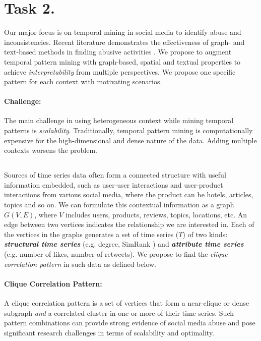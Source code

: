


\section{Task 2. \Ttwo}

Our major focus is on temporal mining in social media to identify abuse and inconsistencies. Recent literature demonstrates the effectiveness of graph- and text-based methods in finding abusive activities \cite{Akoglu:13,Jindal:08,Jindal:10}. We propose to augment temporal pattern mining with graph-based, spatial and textual properties to achieve {\it interpretability} from multiple perspectives. We propose one specific pattern for each context with motivating scenarios. %

\paragraph{Challenge:} The main challenge in using heterogeneous context while mining temporal patterns is {\it scalability}. Traditionally, temporal pattern mining is computationally expensive for the high-dimensional and dense nature of the data. Adding multiple contexts worsens the problem.


\subsection{\Ttwotwo}  

Sources of time series data often form a connected structure with useful information embedded, such as user-user interactions and user-product interactions from various social media, where the product can be hotels, articles, topics and so on. We can formulate this contextual information as a graph $G(V,E)$, where $V$ includes users, products, reviews, topics, locations, etc. An edge between two vertices indicates the relationship we are interested in. Each of the vertices in the graphs generates a set of time series ($T$) of two kinds: \textbf{\textit{structural time series}} (e.g. degree, SimRank \cite{Jeh2002}) and \textbf{\textit{attribute time series}} (e.g. number of likes, number of retweets). We propose to find the {\it clique correlation pattern} in such data as defined below.


\paragraph{Clique Correlation Pattern:} A clique correlation pattern is a set of vertices that form a near-clique or dense subgraph {\it and} a correlated cluster in one or more of their time series. Such pattern combinations can provide strong evidence of social media abuse and pose significant research challenges in terms of scalability and optimality.

